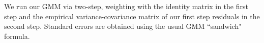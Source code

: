 \documentclass{article}
\begin{document}
We run our GMM via two-step, weighting with the identity matrix in the first step and the empirical variance-covariance matrix of our first step residuals in the second step. Standard errors are obtained using the usual GMM ``sandwich" formula.














\end{document}
